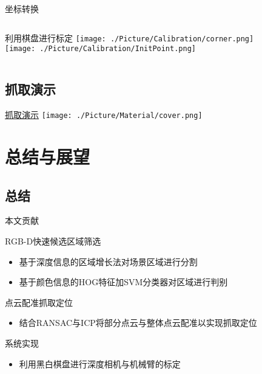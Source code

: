 \documentclass[xcolor=table,compress,blue]{beamer}
\begin{document}
\begin{frame}{坐标转换}
\begin{columns}[t]
			\begin{exampleblock}{利用棋盘进行标定}
				\texttt{[image: ./Picture/Calibration/corner.png]}
				\\
				
				\texttt{[image: ./Picture/Calibration/InitPoint.png]}
			\end{exampleblock}
		\end{columns}
	\end{frame}	

	\subsection{抓取演示}
	
	\begin{frame}{\href{./Video/demo-grasping.mp4}{抓取演示}}
		\texttt{[image: ./Picture/Material/cover.png]}
	\end{frame}	


\section{总结与展望}	
\subsection{总结}
\begin{frame}{本文贡献}
	\begin{exampleblock}{RGB-D快速候选区域筛选}
		\begin{itemize}
			\item 基于深度信息的区域增长法对场景区域进行分割
			\item 基于颜色信息的HOG特征加SVM分类器对区域进行判别
		\end{itemize}
	\end{exampleblock}	
	\begin{exampleblock}{点云配准抓取定位}
		\begin{itemize}
			\item 结合RANSAC与ICP将部分点云与整体点云配准以实现抓取定位
		\end{itemize}
	\end{exampleblock}
	\begin{exampleblock}{系统实现}
		\begin{itemize}
			\item 利用黑白棋盘进行深度相机与机械臂的标定
		\end{itemize}
	\end{exampleblock}
\end{frame}	
\end{document}

